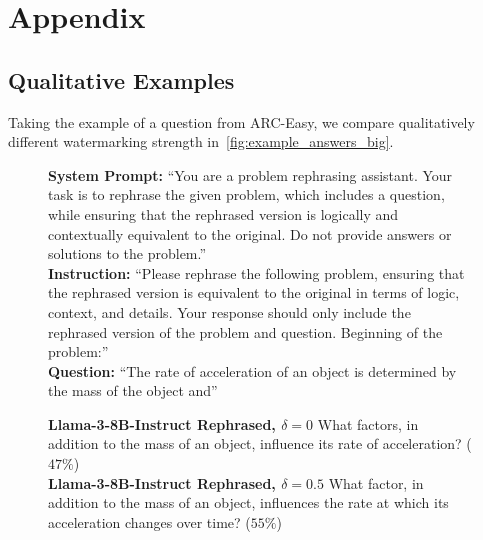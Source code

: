 
\section{Appendix}\label{app:appendix}

\subsection{Qualitative Examples}

Taking the example of a question from ARC-Easy, we compare qualitatively different watermarking strength in~\autoref{fig:example_answers_big}.

\begin{figure}[b!]
    \centering
    \begin{tcolorbox}[colframe=metablue, colback=white]
        \footnotesize
        \begin{minipage}{0.48\textwidth}
            \textbf{System Prompt:} ``You are a problem rephrasing assistant. Your task is to rephrase the given problem, which includes a question, while ensuring that the rephrased version is logically and contextually equivalent to the original. Do not provide answers or solutions to the problem.''
            \\[4pt]
            \textbf{Instruction:} ``Please rephrase the following problem, ensuring that the rephrased version is equivalent to the original in terms of logic, context, and details. Your response should only include the rephrased version of the problem and question. Beginning of the problem:''
            \\[4pt]
            \textbf{Question:} ``The rate of acceleration of an object is determined by the mass of the object and''
        \end{minipage}\hspace{0.04\textwidth}%
        \begin{minipage}{0.48\textwidth}
            \textbf{Llama-3-8B-Instruct Rephrased, $\delta=0$}\newline
            What factors, in addition to the mass of an object, influence its rate of acceleration? ($47\%$)
            \\[4pt]
            \textbf{Llama-3-8B-Instruct Rephrased, $\delta=0.5$}\newline
            What factor, in addition to the mass of an object, influences the rate at which its acceleration changes over time? ($55\%$)

\end{minipage}
\end{tcolorbox}
\end{figure}

